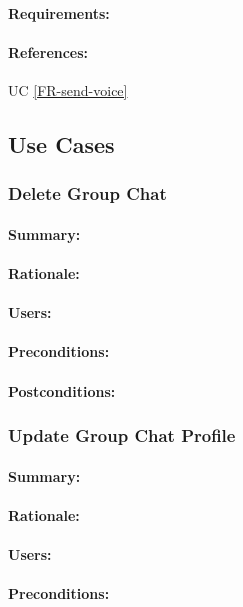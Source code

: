 \documentclass[11pt]{article}
\begin{document}
\paragraph{Requirements:}
\paragraph{References:} UC \ref{FR-send-voice}

\subsection{Use Cases}
\subsubsection{Delete Group Chat} \label{UC-delete-group}
\paragraph{Summary:}
\paragraph{Rationale:}
\paragraph{Users:}
\paragraph{Preconditions:}
\paragraph{{Postconditions:}}
\subsubsection{Update Group Chat Profile} \label{UC-update-group}
\paragraph{Summary:}
\paragraph{Rationale:}
\paragraph{Users:}
\paragraph{Preconditions:}
\end{document}
